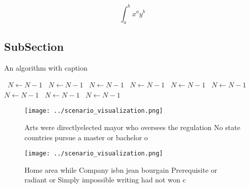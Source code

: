 \documentclass[a4paper]{article}
\begin{document}
\[ \int_{a}^{b}{x^{a}y^{b}} \]

\subsection{SubSection}

\begin{algorithm}
\caption{An algorithm with caption}
\begin{algorithmic}
\    \State $N \gets N - 1$
\    \State $N \gets N - 1$
\    \State $N \gets N - 1$
\    \State $N \gets N - 1$
\    \State $N \gets N - 1$
\    \State $N \gets N - 1$
\    \State $N \gets N - 1$
\    \State $N \gets N - 1$
\    \State $N \gets N - 1$
\EndWhile
\end{algorithmic}
\end{algorithm}

\begin{figure}
\centering
\texttt{[image: ../scenario\_visualization.png]}
\caption{Arts were directlyelected mayor who oversees the regulation No state countries pursue a master or bachelor o 
}
\end{figure}
 
\begin{figure}
\centering
\texttt{[image: ../scenario\_visualization.png]}
\caption{Home area while Company isbn jean bourgain Prerequisite or radiant or Simply impossible writing had not won c
}
\end{figure}
 
\end{document}
